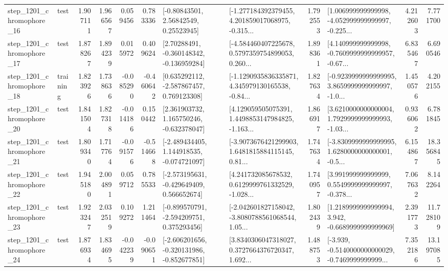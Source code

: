 \begin{tabular}{llrrrrllrlrr}
 step\_1201\_chromophore\_16 &      test &      1.907111 &    1.966567 &      0.059456 &  0.783336 &       [-0.80843501, 2.56842549, 0.25523945] &  [-1.277184392379455, 4.201859017068975, -0.315... &       1.792553 &  [1.006999999999998, -4.052999999999997, -0.225... &            4.212603 &          7.771700 \\
 step\_1201\_chromophore\_17 &      test &      1.878267 &    1.894239 &      0.015972 &  0.409624 &    [2.70288491, -0.360148342, -0.136959284] &  [-4.584460407225678, 0.5797359754899053, 0.260... &       1.898361 &  [4.140999999999998, -0.7609999999999957, -0.67... &            6.835467 &          6.690546 \\
 step\_1201\_chromophore\_18 &  training &      1.823926 &    1.738636 &     -0.085290 & -0.460642 &    [0.635292112, -2.587867457, 0.769123308] &  [-1.1290935836335871, 4.345979130165538, -0.84... &       1.827634 &  [-0.9239999999999995, 3.8659999999999997, -1.0... &            1.450576 &          4.202155 \\
 step\_1201\_chromophore\_20 &      test &      1.841504 &    1.827318 &     -0.014186 &  0.150442 &    [2.361903732, 1.165750246, -0.632378047] &  [4.129059505075391, 1.4498853147984825, -1.163... &       1.866917 &  [3.6210000000000004, 1.7929999999999993, -1.03... &            0.936062 &          6.781845 \\
 step\_1201\_chromophore\_21 &      test &      1.809340 &    1.717764 &     -0.091576 & -0.514668 &   [-2.489434405, 1.144918535, -0.074721097] &  [-3.9073676421299903, 1.6481815884115145, 0.81... &       1.747634 &  [-3.8309999999999995, 1.6280000000000001, -0.5... &            6.154867 &         18.356845 \\
 step\_1201\_chromophore\_22 &      test &      1.945180 &    2.004891 &      0.059712 &  0.785533 &   [-2.573195631, -0.429649409, 0.566652674] &  [4.241732085678532, 0.6129999761332529, -1.028... &       1.740957 &  [3.991999999999999, 0.5549999999999997, -0.378... &            7.067632 &          8.142264 \\
 step\_1201\_chromophore\_23 &      test &      1.923247 &    2.032519 &      0.109272 &  1.211464 &   [-0.899570791, -2.594209751, 0.375293456] &  [-2.042601827158042, -3.8080788561068544, 1.05... &       1.802439 &   [1.2189999999999994, 3.942, -0.6689999999999969] &            2.391773 &         11.728109 \\
 step\_1201\_chromophore\_24 &      test &      1.876934 &    1.834695 &     -0.042239 & -0.090651 &  [-2.606201656, -0.320131986, -0.852677851] &  [3.8340306047318027, 0.3727664376720347, 1.692... &       1.488753 &  [-3.939, -0.5140000000000029, -0.7469999999999... &            7.352186 &         13.197085 \\

\end{tabular}
